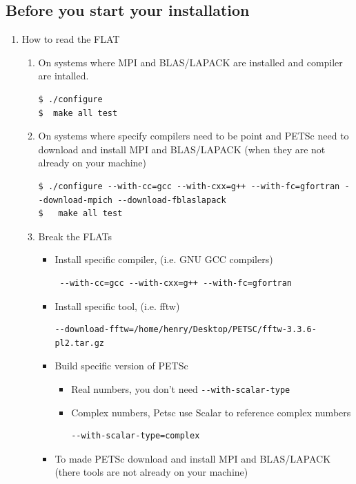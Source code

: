 \documentclass{article}
\begin{document}
\subsection{Before you start your installation} 
\begin{enumerate}
\item How to read the FLAT
\begin{enumerate}
\item On systems where MPI and BLAS/LAPACK are installed and compiler are intalled.
\begin{verbatim}
$ ./configure
$  make all test
\end{verbatim}
\normalsize
\item On systems where specify compilers need to be point and PETSc need to download and install MPI and BLAS/LAPACK (when they are not already on your machine)
\scriptsize
\begin{verbatim}
$ ./configure --with-cc=gcc --with-cxx=g++ --with-fc=gfortran --download-mpich --download-fblaslapack
$   make all test
\end{verbatim}
\normalsize
\item Break the FLATs
\scriptsize
\begin{itemize}
\item Install specific compiler, (i.e. GNU GCC compilers) 
\scriptsize
\begin{verbatim}
 --with-cc=gcc --with-cxx=g++ --with-fc=gfortran
\end{verbatim}
\normalsize
 \item Install specific tool, (i.e. fftw)
 \scriptsize
\begin{verbatim}
--download-fftw=/home/henry/Desktop/PETSC/fftw-3.3.6-pl2.tar.gz
\end{verbatim}
\normalsize
\item Build specific version of PETSc
\begin{itemize}
\item Real numbers, you don't need \verb+--with-scalar-type+ 
\item Complex numbers, Petsc use Scalar to reference complex numbers
\scriptsize
\begin{verbatim}
--with-scalar-type=complex 
\end{verbatim}
\normalsize
\end{itemize}
\item To made PETSc download and install MPI and BLAS/LAPACK (there tools are not already on your machine)
\scriptsize
\begin{verbatim}

\end{verbatim}
\end{itemize}
\end{enumerate}
\end{enumerate}
\end{document}
